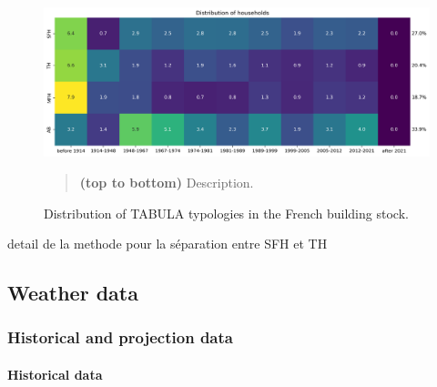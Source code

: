\documentclass[11pt]{article}
\begin{document}
        \begin{figure}[ht]
            \centering
            \includegraphics[width=0.99\columnwidth]{figures/bgc_distribution_tabula_households_ponderated.png}
            \caption{\label{fig:tab_stock} Distribution of TABULA typologies in the French building stock.}
            \begin{quote}
                \vspace{-2mm}
                \small\noindent
                \textbf{(top to bottom)} Description.  
              \end{quote}
        \end{figure}

        detail de la methode pour la séparation entre SFH et TH

        






    


    \clearpage
    \subsection{Weather data} %
    \label{sub:weather_data}

        
        \subsubsection{Historical and projection data} %
        \label{ssub:historical_data}
        
        \paragraph{Historical data}\mbox{}\\ %
        \label{par:historical_data}
        
\end{document}
